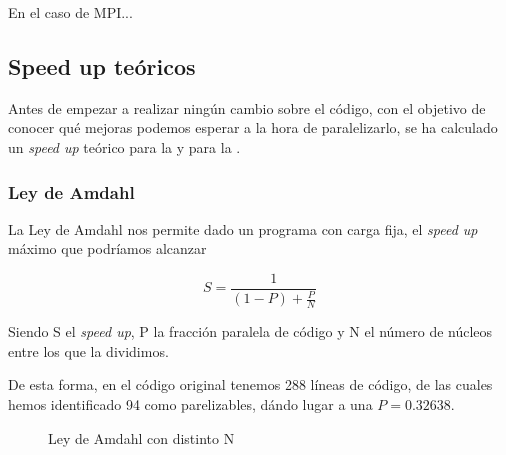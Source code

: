 \documentclass[12pt]{report} %
\begin{document}
\par En el caso de MPI...


\subsection{Speed up teóricos}

Antes de empezar a realizar ningún cambio sobre el código, con el objetivo de conocer qué mejoras podemos esperar a la hora de paralelizarlo, se ha calculado un \textit{speed up} teórico para la  y para la .

\subsubsection{Ley de Amdahl}
\label{sec:Amdahl}

La Ley de Amdahl nos permite dado un programa con carga fija, el \textit{speed up} máximo que podríamos alcanzar

\[ S = \frac{1}{(1 - P) + \frac{P}{N}} \]

Siendo S el \textit{speed up}, P la fracción paralela de código y N el número de núcleos entre los que la dividimos.

De esta forma, en el código original tenemos 288 líneas de código, de las cuales hemos identificado 94 como parelizables, dándo lugar a una $P = 0.32638$.

\begin{figure}[H]
    \caption{Ley de Amdahl con distinto N}
    \label{fig:fig_amdahl}
\end{figure}
\end{document}
